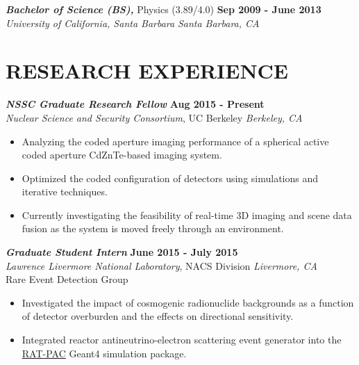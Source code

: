 \documentclass[margin, 10pt]{style/res} %
\begin{document}
\begin{resume}
{\sl\bf Bachelor of Science (BS),} Physics (3.89/4.0) \hfill {\bf Sep 2009 - June 2013} \\
{\sl University of California, Santa Barbara} \hfill {\sl Santa Barbara, CA}
\vspace{2pt}


 

 
\section{\small{RESEARCH EXPERIENCE}}

{\sl\bf NSSC Graduate Research Fellow} \hfill {\bf Aug 2015 - Present} \\
{\sl Nuclear Science and Security Consortium}, UC Berkeley \hfill {\sl Berkeley, CA} %
\vspace{2pt}
\begin{itemize}[leftmargin=4ex] \itemsep -2pt
\item Analyzing the coded aperture imaging performance of a spherical active coded aperture CdZnTe-based imaging system.
\item Optimized the coded configuration of detectors using simulations and iterative techniques.
\item Currently investigating the feasibility of real-time 3D imaging and scene data fusion as the system is moved freely through an environment.   
\end{itemize} 

{\sl\bf Graduate Student Intern} \hfill {\bf June 2015 - July 2015} \\
{\sl Lawrence Livermore National Laboratory}, NACS Division \hfill {\sl Livermore, CA} \\
Rare Event Detection Group
\vspace{2pt}
\begin{itemize}[leftmargin=4ex] \itemsep -2pt
\item Investigated the impact of cosmogenic radionuclide backgrounds as a function of detector overburden and the effects on directional sensitivity.
\item Integrated reactor antineutrino-electron scattering event generator into the \href{https://github.com/rat-pac/rat-pac}{RAT-PAC} Geant4 simulation package.
\end{itemize} 


\end{resume}
\end{document}
